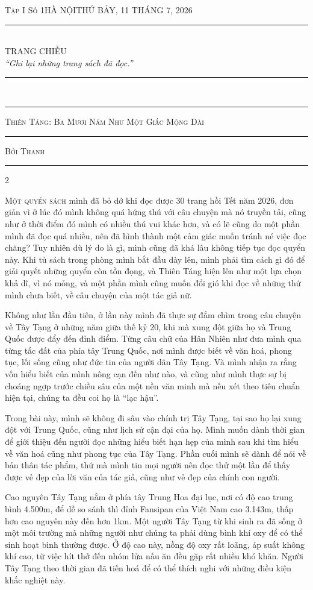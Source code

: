 \documentclass[11pt,a4paper]{article}
\newcommand{\PaperName}{TRANG CHIỀU}
\newcommand{\PaperMotto}{``Ghi lại những trang sách đã đọc.''}
\newcommand{\PaperPlace}{HÀ NỘI}
\newcommand{\PaperDate}{THỨ BẢY, 11 THÁNG 7, 2026}
\newcommand{\PaperIssue}{Tập I \textperiodcentered{} Số 1}
\newcommand{\masthead}{%
  \begin{center}
    {\footnotesize\scshape \PaperIssue \hfill \PaperPlace \hfill \PaperDate}\\[2pt]
    \rule{\textwidth}{0.4pt}\\[4pt]
    {\fontsize{34}{36}\selectfont\scshape \PaperName}\\[3pt]
    {\small\itshape \PaperMotto}\\[4pt]
    \rule{\textwidth}{1.4pt}\\[-2.5pt]
    \rule{\textwidth}{0.4pt}
  \end{center}
}
\newcommand{\headline}[1]{%
  \begin{center}{\LARGE\scshape #1}\\[2pt]\rule{0.35\textwidth}{0.4pt}\end{center}}
\newcommand{\byline}[1]{%
  \begin{center}{\footnotesize\scshape Bởi #1}\\[2pt]\rule{0.2\textwidth}{0.4pt}\end{center}\vspace{4pt}}
\newcommand{\sectionbreak}{%
  \par\vspace{8pt}{\centering *\quad*\quad*\par}\vspace{8pt}}
\begin{document}
\masthead

\headline{Thiên Táng: Ba Mươi Năm Như Một Giấc Mộng Dài}
\byline{Thanh}

\begin{multicols}{2}

\lettrine[lines=3,lhang=0.05]{M}{ột quyển sách} mình đã bỏ dở khi đọc
được 30 trang hồi Tết năm 2026, đơn giản vì ở lúc đó mình không quá
hứng thú với câu chuyện mà nó truyền tải, cũng như ở thời điểm đó mình
có nhiều thú vui khác hơn, và có lẽ cũng do một phần mình đã đọc quá
nhiều, nên đã hình thành một cảm giác muốn tránh né việc đọc chăng?
Tuy nhiên dù lý do là gì, mình cũng đã khá lâu không tiếp tục đọc
quyển này. Khi tủ sách trong phòng mình bắt đầu dày lên, mình phải
tìm cách gì đó để giải quyết những quyển còn tồn đọng, và Thiên Táng
hiện lên như một lựa chọn khả dĩ, vì nó mỏng, và một phần mình cũng
muốn đổi gió khi đọc về những thứ mình chưa biết, về câu chuyện của
một tác giả nữ.

Không như lần đầu tiên, ở lần này mình đã thực sự đắm chìm trong câu
chuyện về Tây Tạng ở những năm giữa thế kỷ 20, khi mà xung đột giữa
họ và Trung Quốc được đẩy đến đỉnh điểm. Từng câu chữ của Hân Nhiên
như đưa mình qua từng tấc đất của phía tây Trung Quốc, nơi mình được
biết về văn hoá, phong tục, lối sống cũng như đức tin của người dân
Tây Tạng. Và mình nhận ra rằng vốn hiểu biết của mình nông cạn đến
như nào, và cũng như mình thực sự bị choáng ngợp trước chiều sâu của
một nền văn minh mà nếu xét theo tiêu chuẩn hiện tại, chúng ta đều
coi họ là ``lạc hậu''.

Trong bài này, mình sẽ không đi sâu vào chính trị Tây Tạng, tại sao
họ lại xung đột với Trung Quốc, cũng như lịch sử cận đại của họ.
Mình muốn dành thời gian để giới thiệu đến người đọc những hiểu biết
hạn hẹp của mình sau khi tìm hiểu về văn hoá cũng như phong tục của
Tây Tạng. Phần cuối mình sẽ dành để nói về bản thân tác phẩm, thứ mà
mình tin mọi người nên đọc thử một lần để thấy được vẻ đẹp của lời
văn của tác giả, cũng như vẻ đẹp của chính con người.

\sectionbreak

Cao nguyên Tây Tạng nằm ở phía tây Trung Hoa đại lục, nơi có độ cao
trung bình 4.500m, để dễ so sánh thì đỉnh Fansipan của Việt Nam cao
3.143m, thấp hơn cao nguyên này đến hơn 1km. Một người Tây Tạng từ
khi sinh ra đã sống ở một môi trường mà những người như chúng ta phải
dùng bình khí oxy để có thể sinh hoạt bình thường được. Ở độ cao này,
nồng độ oxy rất loãng, áp suất không khí cao, từ việc hít thở đến
nhóm lửa nấu ăn đều gặp rất nhiều khó khăn. Người Tây Tạng theo thời
gian đã tiến hoá để có thể thích nghi với những điều kiện khắc nghiệt
này.


\end{multicols}
\end{document}
